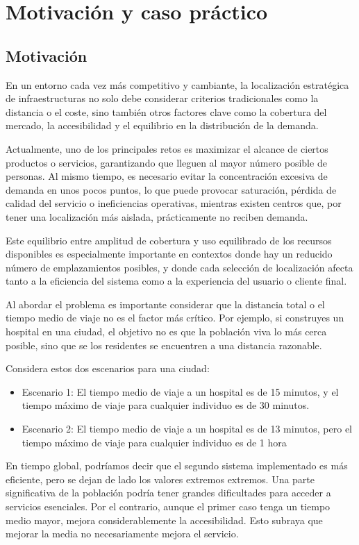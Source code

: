 \documentclass[12pt,a4paper]{book}
\begin{document}
\section{Motivación y caso práctico}

\subsection{Motivación}
En un entorno cada vez más competitivo y cambiante, la localización estratégica de infraestructuras no solo debe considerar criterios tradicionales como la distancia o el coste, sino también otros factores clave como la cobertura del mercado, la accesibilidad y el equilibrio en la distribución de la demanda.

Actualmente, uno de los principales retos es maximizar el alcance de ciertos productos o servicios, garantizando que lleguen al mayor número posible de personas. Al mismo tiempo, es necesario evitar la concentración excesiva de demanda en unos pocos puntos, lo que puede provocar saturación, pérdida de calidad del servicio o ineficiencias operativas, mientras existen centros que, por tener una localización más aislada, prácticamente no reciben demanda.

Este equilibrio entre amplitud de cobertura y uso equilibrado de los recursos disponibles es especialmente importante en contextos donde hay un reducido número de emplazamientos posibles, y donde cada selección de localización afecta tanto a la eficiencia del sistema como a la experiencia del usuario o cliente final.

Al abordar el problema es importante considerar que la distancia total o el tiempo medio de viaje no es el factor más crítico. Por ejemplo, si construyes un hospital en una ciudad, el objetivo no es que la población viva lo más cerca posible, sino que se
los residentes se encuentren a una distancia razonable. 

Considera estos dos escenarios para una ciudad:
\begin{itemize}
    \item Escenario 1: El tiempo medio de viaje a un hospital es de 15 minutos, y el tiempo máximo de viaje para cualquier individuo es de 30 minutos.
    \item Escenario 2: El tiempo medio de viaje a un hospital es de 13 minutos, pero el tiempo máximo de viaje para cualquier individuo es de 1 hora
\end{itemize} 
En tiempo global, podríamos decir que el segundo sistema implementado es más eficiente, pero se dejan de lado los valores extremos extremos. Una parte significativa de la población podría tener grandes dificultades para acceder a servicios esenciales. Por el contrario, aunque el primer caso tenga un tiempo medio mayor, mejora considerablemente la accesibilidad. Esto subraya que mejorar la media no necesariamente mejora el servicio.
\end{document}
